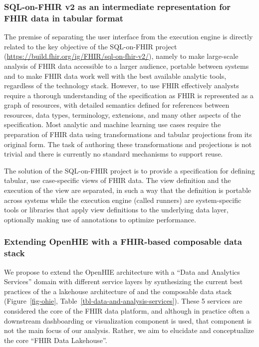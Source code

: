 \documentclass[
  authoryear]{elsarticle}
\begin{document}
\subsubsection{SQL-on-FHIR v2 as an intermediate representation for FHIR
data in tabular
format}\label{sql-on-fhir-v2-as-an-intermediate-representation-for-fhir-data-in-tabular-format}

The premise of separating the user interface from the execution engine
is directly related to the key objective of the SQL-on-FHIR project
(\url{https://build.fhir.org/ig/FHIR/sql-on-fhir-v2/}), namely to make
large-scale analysis of FHIR data accessible to a larger audience,
portable between systems and to make FHIR data work well with the best
available analytic tools, regardless of the technology stack. However,
to use FHIR effectively analysts require a thorough understanding of the
specification as FHIR is represented as a graph of resources, with
detailed semantics defined for references between resources, data types,
terminology, extensions, and many other aspects of the specification.
Most analytic and machine learning use cases require the preparation of
FHIR data using transformations and tabular projections from its
original form. The task of authoring these transformations and
projections is not trivial and there is currently no standard mechanisms
to support reuse.

The solution of the SQL-on-FHIR project is to provide a specification
for defining tabular, use case-specific views of FHIR data. The view
definition and the execution of the view are separated, in such a way
that the definition is portable across systems while the execution
engine (called runners) are system-specific tools or libraries that
apply view definitions to the underlying data layer, optionally making
use of annotations to optimize performance.

\subsubsection{Extending OpenHIE with a FHIR-based composable data
stack}\label{extending-openhie-with-a-fhir-based-composable-data-stack}

We propose to extend the OpenHIE architecture with a ``Data and
Analytics Services'' domain with different service layers by
synthesizing the current best practices of the a lakehouse architecture
of \citep{hai2023data, harby2022data, harby2024data} and the composable
data stack \citep{pedreira2023composable} (Figure~\ref{fig-ohie},
Table~\ref{tbl-data-and-analysis-services}). These 5 services are
considered the core of the FHIR data platform, and although in practice
often a downstream dashboarding or visualization component is used, that
component is not the main focus of our analysis. Rather, we aim to
elucidate and conceptualize the core ``FHIR Data Lakehouse''.
\end{document}
